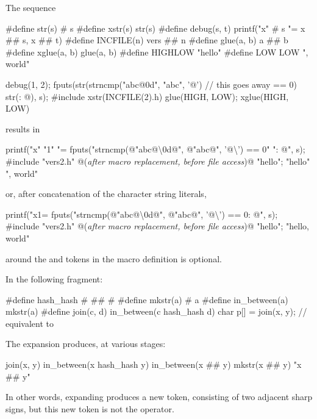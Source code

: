 \documentclass{wg21}
\newcommand{\cwhitespace}[1]{\removed{#1} \added{\grammarterm{whitespace}}}
\begin{document}
\pnum
\begin{example}
    The sequence
    \begin{codeblock}
        #define str(s)      # s
        #define xstr(s)     str(s)
        #define debug(s, t) printf("x" # s "= %
        x ## s, x ## t)
        #define INCFILE(n)  vers ## n
        #define glue(a, b)  a ## b
        #define xglue(a, b) glue(a, b)
        #define HIGHLOW     "hello"
        #define LOW         LOW ", world"

        debug(1, 2);
        fputs(str(strncmp("abc@\textbackslash@0d", "abc", '@')        // this goes away
        == 0) str(: @\atsign\textbackslash@n), s);
        #include xstr(INCFILE(2).h)
        glue(HIGH, LOW);
        xglue(HIGH, LOW)
    \end{codeblock}
    results in
    \begin{codeblock}
        printf("x" "1" "= %
        fputs("strncmp(@\textbackslash@"abc@\textbackslash\textbackslash@0d@\textbackslash@", @\textbackslash@"abc@\textbackslash@", '@\textbackslash{}') == 0" ": @\atsign\textbackslash@n", s);
        #include "vers2.h"      @\textrm{(\textit{after macro replacement, before file access})}@
        "hello";
        "hello" ", world"
    \end{codeblock}
    or, after concatenation of the character string literals,
    \begin{codeblock}
        printf("x1= %
        fputs("strncmp(@\textbackslash@"abc@\textbackslash\textbackslash@0d@\textbackslash@", @\textbackslash@"abc@\textbackslash@", '@\textbackslash{}') == 0: @\atsign\textbackslash@n", s);
        #include "vers2.h"      @\textrm{(\textit{after macro replacement, before file access})}@
        "hello";
        "hello, world"
    \end{codeblock}

    \cwhitespace{Space} around the \tcode{\#} and \tcode{\#\#} tokens in the macro definition
    is optional.
\end{example}

\pnum
\begin{example}
    In the following fragment:

    \begin{codeblock}
        #define hash_hash # ## #
        #define mkstr(a) # a
        #define in_between(a) mkstr(a)
        #define join(c, d) in_between(c hash_hash d)
        char p[] = join(x, y);          // equivalent to 
    \end{codeblock}

    The expansion produces, at various stages:

    \begin{codeblock}
        join(x, y)
        in_between(x hash_hash y)
        in_between(x ## y)
        mkstr(x ## y)
        "x ## y"
    \end{codeblock}

    In other words, expanding  produces a new token,
    consisting of two adjacent sharp signs, but this new token is not the
    \tcode{\#\#} operator.
\end{example}
\end{document}
